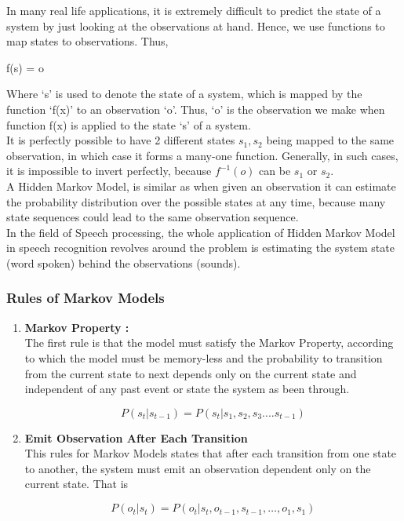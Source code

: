 \documentclass[10pt,twocolumn,letterpaper]{article}
\begin{document}
In many real life applications, it is extremely difficult to predict the state of a system by just looking at the observations at hand. Hence, we use functions to map states to observations. Thus,
\begin{center}\begin{large}
    f(s) = o 
\end{large}
\end{center}
Where ‘s’ is used to denote the state of a system, which is mapped by the function ‘f(x)’ to an observation ‘o’. Thus, ‘o’ is the observation we make when function f(x) is applied to the state ‘s’ of a system.  \\

It is perfectly possible to have 2 different states $s_1, s_2$ being mapped to the same observation, in which case it forms a many-one function. Generally, in such cases, it is impossible to invert perfectly, because $f^{-1}(o)$ can be $s_1$ or $s_2$. \\

A Hidden Markov Model, is similar as when given an observation it can estimate the probability distribution over the possible states at any time, because many state sequences could lead to the same observation sequence. \\

In the field of Speech processing, the whole application of Hidden Markov Model in speech recognition revolves around the problem is estimating the system state (word spoken) behind the observations (sounds). \\


\subsubsection{Rules of Markov Models}
\begin{enumerate}
    \item \textbf{Markov Property : } \\
    The first rule is that the model must satisfy the Markov Property, according to which the model must be memory-less and the probability to transition from the current state to next depends only on the current state and independent of any past event or state the system as been through.
    
    $$P(s_t|s_{t-1}) = P(s_t|s_1,s_2,s_3....s_{t-1}) $$
    \item \textbf{Emit Observation After Each Transition} \\
    This rules for Markov Models states that after each transition from one state to another, the system must emit an observation dependent only on the current state. That is 
    
    $$P(o_{t}| s_{t})= P(o_t| s_t ,o_{t-1} ,s_{t-1} ,…,o_1 ,s_1 )$$
\end{enumerate}
\end{document}
